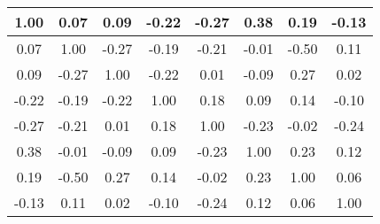 \begin{tabular}{|c|c|c|c|c|c|c|c|}
\hline
1.00&0.07&0.09&-0.22&-0.27&0.38&0.19&-0.13\\\hline
0.07&1.00&-0.27&-0.19&-0.21&-0.01&-0.50&0.11\\\hline
0.09&-0.27&1.00&-0.22&0.01&-0.09&0.27&0.02\\\hline
-0.22&-0.19&-0.22&1.00&0.18&0.09&0.14&-0.10\\\hline
-0.27&-0.21&0.01&0.18&1.00&-0.23&-0.02&-0.24\\\hline
0.38&-0.01&-0.09&0.09&-0.23&1.00&0.23&0.12\\\hline
0.19&-0.50&0.27&0.14&-0.02&0.23&1.00&0.06\\\hline
-0.13&0.11&0.02&-0.10&-0.24&0.12&0.06&1.00\\\hline
\end{tabular}
